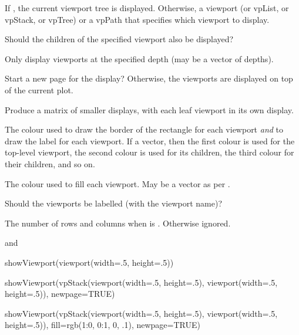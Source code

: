%
\begin{Arguments}
\begin{ldescription}
\item[\code{vp}] 
If , the current viewport tree is displayed.
Otherwise, a viewport (or vpList, or vpStack, or vpTree) or
a vpPath that specifies which viewport to display.

\item[\code{recurse}] 
Should the children of the specified viewport also be displayed?

\item[\code{depth}] 
Only display viewports at the specified depth (may be a vector
of depths).

\item[\code{newpage}] 
Start a new page for the display?  Otherwise, the viewports
are displayed on top of the current plot.

\item[\code{leaves}] 
Produce a matrix of smaller displays, with each leaf viewport
in its own display.

\item[\code{col}] 
The colour used to draw the border of the rectangle for each
viewport \emph{and} to draw the label for each viewport.
If a vector, then the first colour is used for the
top-level viewport, the second colour is used for its children,
the third colour for their children, and so on.

\item[\code{fill}] 
The colour used to fill each viewport.  May be a vector as per
.

\item[\code{label}] 
Should the viewports be labelled (with the viewport name)?

\item[\code{nrow, ncol}] 
The number of rows and columns when  is .
Otherwise ignored.

\end{ldescription}
\end{Arguments}
%
\begin{SeeAlso}\relax
{} and
\end{SeeAlso}
%
\begin{Examples}
\begin{ExampleCode}
showViewport(viewport(width=.5, height=.5))

showViewport(vpStack(viewport(width=.5, height=.5),
                     viewport(width=.5, height=.5)),
             newpage=TRUE)

showViewport(vpStack(viewport(width=.5, height=.5),
                     viewport(width=.5, height=.5)),
             fill=rgb(1:0, 0:1, 0, .1),
             newpage=TRUE)
\end{ExampleCode}
\end{Examples}

